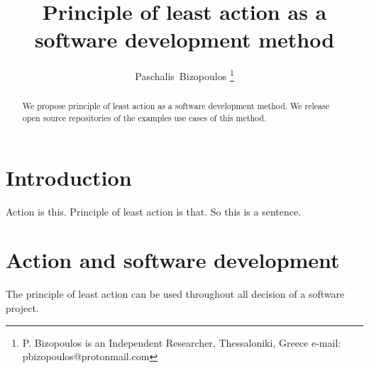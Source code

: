 \documentclass[journal]{IEEEtran}
\begin{document}

\title{Principle of least action as a software development method}

\author{Paschalis~Bizopoulos
\thanks{P. Bizopoulos is an Independent Researcher, Thessaloniki, Greece e-mail: pbizopoulos@protonmail.com}}

\maketitle

\begin{abstract}
	We propose principle of least action as a software development method.
	We release open source repositories of the examples use cases of this method.
\end{abstract}

\section{Introduction}
Action is this.
Principle of least action is that.
So this is a sentence.

\section{Action and software development}
The principle of least action can be used throughout all decision of a software project.
\end{document}
